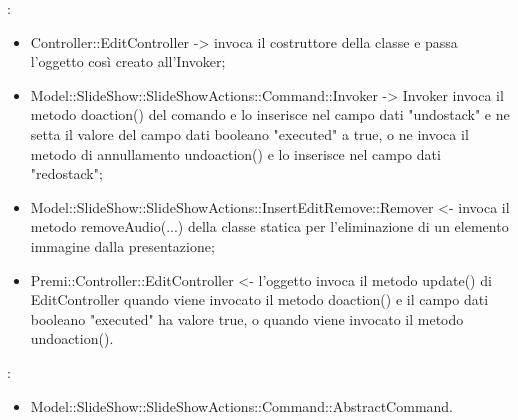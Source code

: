 {{				\textbf{\relaz}: 
				\begin{itemize}
					\item Controller::\-EditController -> invoca il costruttore della classe e passa l’oggetto così creato all’Invoker;
					\item Model::\-SlideShow::\-SlideShowActions::\-Command::\-Invoker -> Invoker invoca il metodo doaction() del comando e lo inserisce nel campo dati "undostack" e ne setta il valore del campo dati booleano "executed" a true, o ne invoca il metodo di annullamento undoaction() e lo inserisce nel campo dati "redostack";
                    \item Model::\-SlideShow::\-SlideShowActions::\-InsertEditRemove::\-Remover <- invoca il metodo removeAudio(...) della classe statica per l’eliminazione di un elemento immagine dalla presentazione;
                    \item Premi::\-Controller::\-EditController <- l'oggetto invoca il metodo update() di EditController quando viene invocato il metodo doaction() e il campo dati booleano "executed" ha valore true, o quando viene invocato il metodo undoaction().
				\end{itemize}	
                \textbf{\base}: 
                    \begin{itemize}
                    \item Model::\-SlideShow::\-SlideShowActions::\-Command::\-AbstractCommand.
                    \end{itemize}
                    }
                    }
